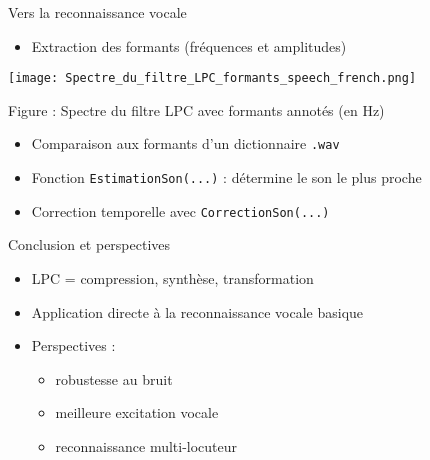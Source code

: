 \documentclass{beamer}
\begin{document}
\begin{frame}{Vers la reconnaissance vocale}
  \begin{itemize}
    \item Extraction des formants (fréquences et amplitudes)
  \end{itemize}

  \centering
  \texttt{[image: Spectre\_du\_filtre\_LPC\_formants\_speech\_french.png]}
  
  \vspace{0.1em}
  {\tiny Figure : Spectre du filtre LPC avec formants annotés (en Hz)}

  \vspace{0.8em}
  \begin{itemize}
    \item Comparaison aux formants d’un dictionnaire \texttt{.wav}
    \item Fonction \texttt{EstimationSon(...)} : détermine le son le plus proche
    \item Correction temporelle avec \texttt{CorrectionSon(...)}
  \end{itemize}
\end{frame}




\begin{frame}{Conclusion et perspectives}
  \begin{itemize}
    \item LPC = compression, synthèse, transformation
    \item Application directe à la reconnaissance vocale basique
    \item Perspectives :
    \begin{itemize}
        \item robustesse au bruit
        \item meilleure excitation vocale
        \item reconnaissance multi-locuteur
    \end{itemize}
  \end{itemize}
\end{frame}
\end{document}
